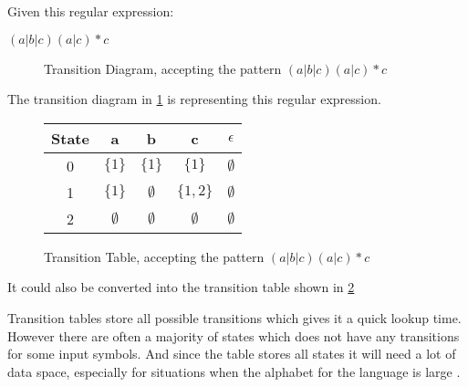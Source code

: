 \begin{example} \label{regexp2td}
Given this regular expression:
\begin{center}
    $(a|b|c)(a|c)* c$ 
\end{center}

\begin{figure}[h!]
  \centering
  \caption{Transition Diagram, accepting the pattern $(a|b|c)(a|c)* c$
  \label{fig:td}}
\end{figure}

The transition diagram in \cref{fig:td} is representing this regular expression.

\begin{figure}[h!]
  \centering
  \begin{tabular}{| c | c c c c |}
    \hline
    \hline
    State & a & b & c & $\epsilon$\\
    \hline
    0 & $\{1\}$ & $\{1\}$ & $\{1\}$ & $\emptyset$ \\
    1 & $\{1\}$ & $\emptyset$ & $\{1,2\}$ & $\emptyset$ \\
    2 & $\emptyset$ & $\emptyset$ & $\emptyset$ & $\emptyset$ \\
    \hline
  \end{tabular}
  \caption{Transition Table, accepting the pattern $(a|b|c)(a|c)* c$
  \label{fig:tt}}
\end{figure}

It could also be converted into the transition table shown in \cref{fig:tt}
\end{example}

Transition tables store all possible transitions which gives it a quick lookup
time. However there are often a majority of states which does not have any
transitions for some input symbols. And since the table stores all states it
will need a lot of data space, especially for situations when the alphabet for
the language is large \cite{Aho2006}.

